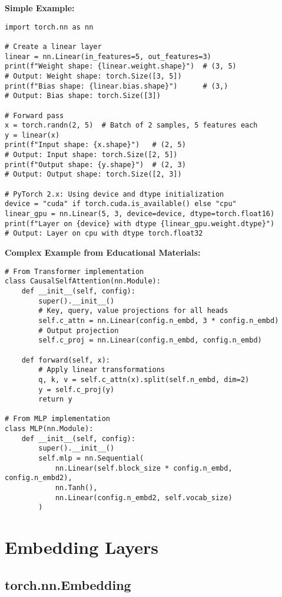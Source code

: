 \documentclass[11pt,a4paper]{book}
\begin{document}
\textbf{Simple Example:}
\begin{verbatim}
import torch.nn as nn

# Create a linear layer
linear = nn.Linear(in_features=5, out_features=3)
print(f"Weight shape: {linear.weight.shape}")  # (3, 5)
# Output: Weight shape: torch.Size([3, 5])
print(f"Bias shape: {linear.bias.shape}")      # (3,)
# Output: Bias shape: torch.Size([3])

# Forward pass
x = torch.randn(2, 5)  # Batch of 2 samples, 5 features each
y = linear(x)
print(f"Input shape: {x.shape}")   # (2, 5)
# Output: Input shape: torch.Size([2, 5])
print(f"Output shape: {y.shape}")  # (2, 3)
# Output: Output shape: torch.Size([2, 3])

# PyTorch 2.x: Using device and dtype initialization
device = "cuda" if torch.cuda.is_available() else "cpu"
linear_gpu = nn.Linear(5, 3, device=device, dtype=torch.float16)
print(f"Layer on {device} with dtype {linear_gpu.weight.dtype}")
# Output: Layer on cpu with dtype torch.float32
\end{verbatim}

\textbf{Complex Example from Educational Materials:}
\begin{verbatim}
# From Transformer implementation
class CausalSelfAttention(nn.Module):
    def __init__(self, config):
        super().__init__()
        # Key, query, value projections for all heads
        self.c_attn = nn.Linear(config.n_embd, 3 * config.n_embd)
        # Output projection
        self.c_proj = nn.Linear(config.n_embd, config.n_embd)
    
    def forward(self, x):
        # Apply linear transformations
        q, k, v = self.c_attn(x).split(self.n_embd, dim=2)
        y = self.c_proj(y)
        return y

# From MLP implementation
class MLP(nn.Module):
    def __init__(self, config):
        super().__init__()
        self.mlp = nn.Sequential(
            nn.Linear(self.block_size * config.n_embd, config.n_embd2),
            nn.Tanh(),
            nn.Linear(config.n_embd2, self.vocab_size)
        )
\end{verbatim}

\section{Embedding Layers}

\subsection{torch.nn.Embedding}
\end{document}
